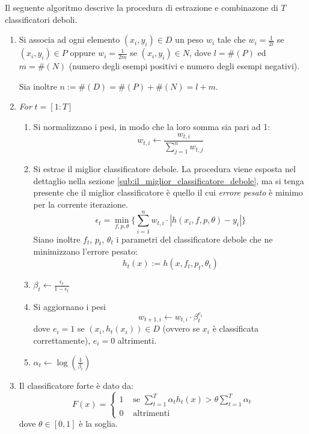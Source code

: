 Il seguente algoritmo descrive la procedura di estrazione e combinazone di $T$ classificatori deboli.

\begin{enumerate}
    \item Si associa ad ogni elemento $(x_i, y_i) \in D$ un peso $w_i$ tale che $w_i = \frac{1}{2l}$ se $(x_i, y_i) \in P$ oppure $w_i = \frac{1}{2m}$ se $(x_i, y_i) \in N$, dove $l = \#(P)$ ed $m = \#(N)$ (numero degli esempi positivi e numero degli esempi negativi).

    Sia inoltre $n := \#(D) = \#(P) + \#(N) = l + m$.

    \item \emph{For} $t = [1:T]$
    \begin{enumerate}
        \item Si normalizzano i pesi, in modo che la loro somma sia pari ad 1:
        $$ w_{t,i} \leftarrow \frac{w_{t,i}}{\sum_{j = 1}^{n}w_{t,j}}$$

        \item \label{adaboost_minimum_error}
        Si estrae il miglior classificatore debole. La procedura viene esposta nel dettaglio nella sezione \ref{sub:il_miglior_classificatore_debole}, ma si tenga presente che il miglior classificatore è quello il cui \emph{errore pesato} è minimo per la corrente iterazione.
        $$ \epsilon_t = \min_{f,p,\theta} \{
        \sum_{i = 1}^{n} w_{t,i} \cdot |h(x_i, f, p, \theta) - y_i|
        \} $$
        Siano inoltre $f_t$, $p_t$, $\theta_t$ i parametri del classificatore debole che ne minimizzano l'errore pesato:
        $$ h_t(x) := h(x, f_t, p_t, \theta_t) $$

        \item \label{adaboost_beta} $\beta_t \leftarrow \frac{\epsilon_t}{1 - \epsilon_t}$

        \item \label{adaboost_update_weights} Si aggiornano i pesi
        $$ w_{t+1, i} \leftarrow w_{t,i} \cdot \beta_{t}^{e_i} $$
        dove $e_i = 1$ se $(x_i, h_t(x_i)) \in D$ (ovvero se $x_i$ è classificata correttamente), $e_i = 0$ altrimenti.

        \item $\alpha_t \leftarrow \log(\frac{1}{\beta_t})$
    \end{enumerate}

    \item \label{adaboost_strong_classifier} Il classificatore forte è dato da:
    \begin{equation}
        F(x) = \begin{cases}
        1 & \text{ se } \sum_{t = 1}^{T} \alpha_t h_t(x) > \theta \sum_{t = 1}^{T} \alpha_t \\
        0 & \text{ altrimenti }
    \end{cases}
\end{equation}
dove $\theta \in [0,1]$ è la soglia.
\end{enumerate}

